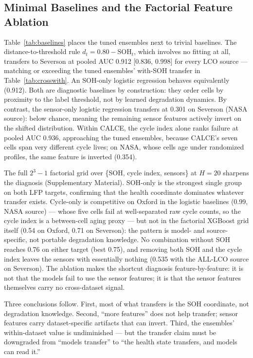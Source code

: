 \documentclass[11pt,a4paper]{article}
\begin{document}
\subsection{Minimal Baselines and the Factorial Feature Ablation}
Table~\ref{tab:baselines} places the tuned ensembles next to trivial baselines. The distance-to-threshold rule $d_t = 0.80 - \mathrm{SOH}_t$, which involves no fitting at all, transfers to Severson at pooled AUC 0.912 [0.836, 0.998] for every LCO source --- matching or exceeding the tuned ensembles' with-SOH transfer in Table~\ref{tab:crosswith}. An SOH-only logistic regression behaves equivalently (0.912). Both are diagnostic baselines by construction: they order cells by proximity to the label threshold, not by learned degradation dynamics. By contrast, the sensor-only logistic regression transfers at 0.301 on Severson (NASA source): below chance, meaning the remaining sensor features actively invert on the shifted distribution. Within CALCE, the cycle index alone ranks failure at pooled AUC 0.936, approaching the tuned ensembles, because CALCE's seven cells span very different cycle lives; on NASA, whose cells age under randomized profiles, the same feature is inverted (0.354).

The full $2^3-1$ factorial grid over \{SOH, cycle index, sensors\} at $H{=}20$ sharpens the diagnosis (Supplementary Material). SOH-only is the strongest single group on both LFP targets, confirming that the health coordinate dominates whatever transfer exists. Cycle-only is competitive on Oxford in the logistic baselines (0.99, NASA source) --- whose five cells fail at well-separated raw cycle counts, so the cycle index is a between-cell aging proxy --- but not in the factorial XGBoost grid itself (0.54 on Oxford, 0.71 on Severson): the pattern is model- and source-specific, not portable degradation knowledge. No combination without SOH reaches 0.76 on either target (best 0.75), and removing both SOH and the cycle index leaves the sensors with essentially nothing (0.535 with the ALL-LCO source on Severson). The ablation makes the shortcut diagnosis feature-by-feature: it is not that the models fail to use the sensor features; it is that the sensor features themselves carry no cross-dataset signal.

Three conclusions follow. First, most of what transfers is the SOH coordinate, not degradation knowledge. Second, ``more features'' does not help transfer; sensor features carry dataset-specific artifacts that can invert. Third, the ensembles' within-dataset value is undiminished --- but the transfer claim must be downgraded from ``models transfer'' to ``the health state transfers, and models can read it.''
\end{document}
